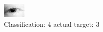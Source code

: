 \begin{figure}[h!]
\begin{center}
\includegraphics[width=0.60\columnwidth]{figures/ID158_class_4_target_3.png}
\end{center}
\caption{ Classification: 4 actual target: 3}
\label{fig:ID158_class_4_target_3}
\end{figure}
